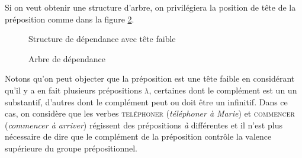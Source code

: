 Si on veut obtenir une structure d'arbre, on privilégiera la position de tête de la préposition comme dans la figure \ref{fig:teteprep}.




\begin{figure}[H]
\caption{Structure de dépendance avec tête faible\label{fig:tetefaible}}
\end{figure}


\begin{figure}[H]
\caption{Arbre de dépendance\label{fig:teteprep}}
\end{figure}

Notons qu'on peut objecter que la préposition est une tête faible en considérant qu'il y a en fait  plusieurs prépositions \textsc{à}, certaines dont le complément est un un substantif, d'autres dont le complément peut ou doit être un infinitif. Dans ce cas, on considère que les verbes \textsc{teléphoner} (\textit{téléphoner à Marie}) et \textsc{commencer} (\textit{commencer à arriver}) régissent des prépositions \textit{à} différentes et il n’est plus nécessaire de dire que le complément de la préposition contrôle la valence supérieure du groupe prépositionnel.


